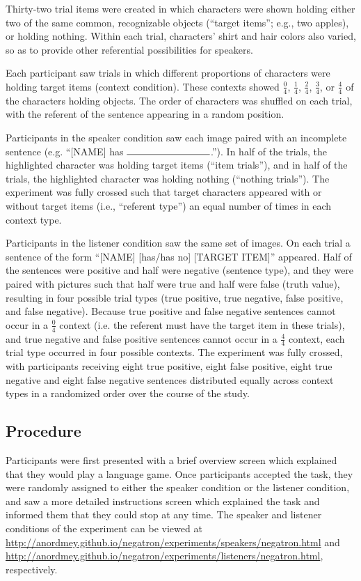 \documentclass[man, noapacite]{apa2}
\begin{document}
Thirty-two trial items were created in which characters were shown holding either two of the same common, recognizable objects (``target items''; e.g., two apples), or holding nothing. Within each trial, characters' shirt and hair colors also varied, so as to provide other referential possibilities for speakers. 

Each participant saw trials in which different proportions of characters were holding target items (context condition).  These contexts showed $\frac{0}{4}$, $\frac{1}{4}$, $\frac{2}{4}$, $\frac{3}{4}$, or $\frac{4}{4}$ of the characters holding objects. The order of characters was shuffled on each trial, with the referent of the sentence appearing in a random position. 

Participants in the speaker condition saw each image paired with an incomplete sentence (e.g. ``[NAME] has $\rule{3cm}{0.15mm}$.''). In half of the trials, the highlighted character was holding target items (``item trials''), and in half of the trials, the highlighted character was holding nothing (``nothing trials'').  The experiment was fully crossed such that target characters appeared with or without target items (i.e., ``referent type'') an equal number of times in each context type.  

Participants in the listener condition saw the same set of images.  On each trial a sentence of the form ``[NAME] [has/has no] [TARGET ITEM]'' appeared.  Half of the sentences were positive and half were negative (sentence type), and they were paired with pictures such that half were true and half were false (truth value), resulting in four possible trial types (true positive, true negative, false positive, and false negative).  Because true positive and false negative sentences cannot occur in a $\frac{0}{4}$ context (i.e. the referent must have the target item in these trials), and true negative and false positive sentences cannot occur in a $\frac{4}{4}$ context, each trial type occurred in four possible contexts.  The experiment was fully crossed, with participants receiving eight true positive, eight false positive, eight true negative and eight false negative sentences distributed equally across context types in a randomized order over the course of the study.  

\subsection{Procedure}

Participants were first presented with a brief overview screen which explained that they would play a language game.  Once participants accepted the task, they were randomly assigned to either the speaker condition or the listener condition, and saw a more detailed instructions screen which explained the task and informed them that they could stop at any time. The speaker and listener conditions of the experiment can be viewed at \url{http://anordmey.github.io/negatron/experiments/speakers/negatron.html} and \url{http://anordmey.github.io/negatron/experiments/listeners/negatron.html}, respectively.
\end{document}
